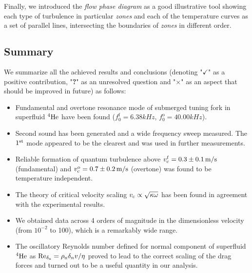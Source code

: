 Finally, we introduced the \textit{flow phase diagram} as a good illustrative tool showing each type of turbulence in particular \textit{zones} and each of the temperature curves as a set of parallel lines, intersecting the boundaries of \textit{zones} in different order.

\subsection*{Summary}

We summarize all the achieved results and conclusions (denoting "$ \checkmark $" as a positive contribution, "\textbf{?}" as an unresolved question and "$ \times $" as an aspect that should be improved in future) as follows:


\begin{itemize}


	\item[\checkmark] Fundamental and overtone resonance mode of submerged tuning fork in superfluid $ {}^4\mathrm{He} $ have been found ($ f_0^{\text{f}} = 6.38\unit{kHz} $, $ f_0^{\text{o}} = 40.00\unit{kHz} $).

	\item[\checkmark] Second sound has been generated and a wide frequency sweep measured. The $ 1^{\mathrm{st}} $ mode appeared to be the clearest and was used in further measurements.

	\item[\checkmark] Reliable formation of quantum turbulence above $ v_{\mathrm{c}}^{\mathrm{{f}}} = 0.3 \pm 0.1 \,\mathrm{m/s}$ (fundamental) and $ v_{\mathrm{c}}^{\mathrm{{o}}} = 0.7 \pm 0.2 \,\mathrm{m/s}$ (overtone) was found to be temperature independent.

	\item[\checkmark] The theory of critical velocity scaling $ v_{\mathrm{c}} \propto \sqrt{\kappa\omega}$ has been found in agreement with the experimental results.

	\item[\checkmark] We obtained data across 4 orders of magnitude in the dimensionless velocity (from $ 10^{-2} $ to 100), which is a remarkably wide range.

	\item[\checkmark] The oscillatory Reynolds number defined for normal component of superfluid $ {}^4\mathrm{He} $ as $\text{Re}_{\delta_{\mathrm{n}}} = \rho_{\mathrm{n}}\delta_{n} v/\eta$ proved to lead to the correct scaling of the drag forces and turned out to be a useful quantity in our analysis.


\end{itemize}
